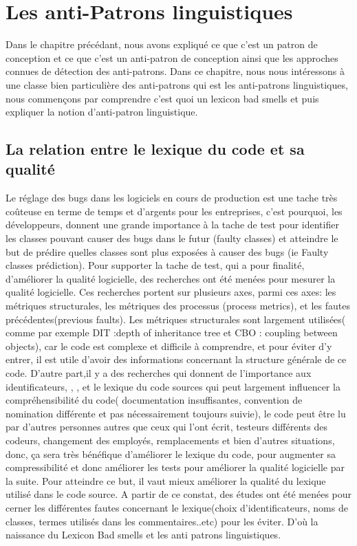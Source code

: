 \chapter{Les anti-Patrons linguistiques }
Dans le chapitre précédant, nous avons expliqué ce que c'est un patron de conception  et ce que c'est un anti-patron de conception ainsi que les approches connues de détection des anti-patrons.
  \vspace{5px}
Dans ce chapitre, nous nous intéressons à une classe bien particulière des anti-patrons qui est les anti-patrons linguistiques, nous commençons par comprendre c'est quoi un lexicon bad smells et puis expliquer la notion d'anti-patron linguistique.
\section{La relation entre le lexique du code et sa qualité }
Le réglage des bugs dans les logiciels en cours de production est une tache très coûteuse en terme de temps et d’argents pour les entreprises, c’est pourquoi, 
les développeurs, donnent une grande importance à la tache de test pour identifier les classes pouvant causer des bugs dans le futur (faulty classes) 
et atteindre le but de prédire quelles classes sont plus exposées à causer des bugs (ie Faulty classes prédiction). Pour supporter la tache de test, qui a pour finalité, 
d’améliorer la qualité logicielle, des recherches ont été menées pour mesurer la qualité logicielle. Ces recherches portent sur plusieurs axes, parmi ces axes: 
les métriques structurales, les métriques des processus (process metrics), et les fautes précédentes(previous faults)\cite{abebe2012can}.
\newline
Les métriques structurales sont largement utilisées( comme par exemple DIT :depth of inheritance tree et CBO : coupling between objects), car le code est complexe et difficile à comprendre, et pour éviter d’y entrer, il est utile d’avoir des informations concernant la structure générale de ce code.
\newline
D’autre part,il y a des recherches qui donnent de l’importance aux identificateurs, \cite{haiduc2008use}, \cite{butler2009relating}, et le lexique du code sources qui peut largement influencer la compréhensibilité du code( documentation insuffisantes, convention de nomination différente et pas nécessairement toujours suivie), le code peut être lu par d'autres personnes autres que ceux qui l’ont écrit, testeurs différents des codeurs, changement des employés, remplacements et bien d'autres situations, donc, ça sera très bénéfique d’améliorer le lexique du code, pour augmenter sa compressibilité et donc améliorer les tests pour  améliorer la qualité logicielle par la suite\cite{abebe2012can}.
\newline
Pour atteindre ce but, il vaut mieux améliorer la qualité du lexique utilisé dans le code source.
\newline
 \vspace{5px}
A partir de ce constat, des études ont été menées pour cerner les différentes fautes concernant le lexique(choix d’identificateurs, noms de classes, termes utilisés dans les commentaires..etc) pour les éviter.
D’où la naissance du Lexicon Bad smells et les anti patrons linguistiques.
